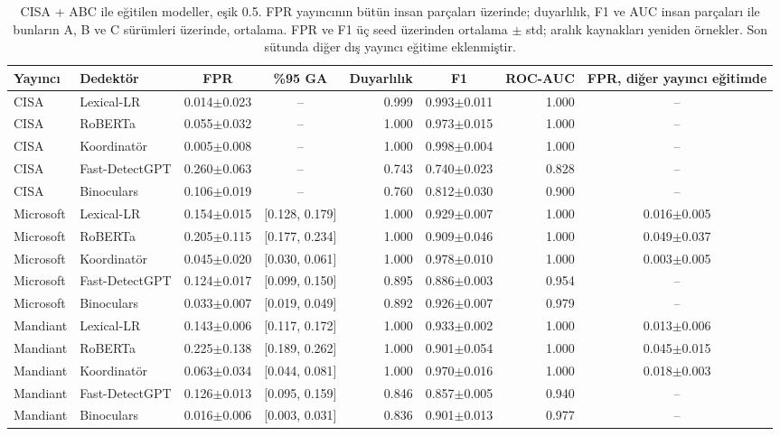 \begin{table}[t]
\centering
\footnotesize
\caption{CISA + ABC ile eğitilen modeller, eşik 0.5. FPR yayıncının bütün insan parçaları üzerinde; duyarlılık, F1 ve AUC insan parçaları ile bunların A, B ve C sürümleri üzerinde, ortalama. FPR ve F1 üç seed üzerinden ortalama $\pm$ std; aralık kaynakları yeniden örnekler. Son sütunda diğer dış yayıncı eğitime eklenmiştir.}
\label{tab:publishers}
\begin{tabular}{llccrcrc}
\toprule
Yayıncı & Dedektör & FPR & \%95 GA & Duyarlılık & F1 & ROC-AUC & FPR, diğer yayıncı eğitimde \\
\midrule
CISA & Lexical-LR & 0.014$\pm$0.023 & -- & 0.999 & 0.993$\pm$0.011 & 1.000 & -- \\
CISA & RoBERTa & 0.055$\pm$0.032 & -- & 1.000 & 0.973$\pm$0.015 & 1.000 & -- \\
CISA & Koordinatör & 0.005$\pm$0.008 & -- & 1.000 & 0.998$\pm$0.004 & 1.000 & -- \\
CISA & Fast-DetectGPT & 0.260$\pm$0.063 & -- & 0.743 & 0.740$\pm$0.023 & 0.828 & -- \\
CISA & Binoculars & 0.106$\pm$0.019 & -- & 0.760 & 0.812$\pm$0.030 & 0.900 & -- \\
Microsoft & Lexical-LR & 0.154$\pm$0.015 & [0.128, 0.179] & 1.000 & 0.929$\pm$0.007 & 1.000 & 0.016$\pm$0.005 \\
Microsoft & RoBERTa & 0.205$\pm$0.115 & [0.177, 0.234] & 1.000 & 0.909$\pm$0.046 & 1.000 & 0.049$\pm$0.037 \\
Microsoft & Koordinatör & 0.045$\pm$0.020 & [0.030, 0.061] & 1.000 & 0.978$\pm$0.010 & 1.000 & 0.003$\pm$0.005 \\
Microsoft & Fast-DetectGPT & 0.124$\pm$0.017 & [0.099, 0.150] & 0.895 & 0.886$\pm$0.003 & 0.954 & -- \\
Microsoft & Binoculars & 0.033$\pm$0.007 & [0.019, 0.049] & 0.892 & 0.926$\pm$0.007 & 0.979 & -- \\
Mandiant & Lexical-LR & 0.143$\pm$0.006 & [0.117, 0.172] & 1.000 & 0.933$\pm$0.002 & 1.000 & 0.013$\pm$0.006 \\
Mandiant & RoBERTa & 0.225$\pm$0.138 & [0.189, 0.262] & 1.000 & 0.901$\pm$0.054 & 1.000 & 0.045$\pm$0.015 \\
Mandiant & Koordinatör & 0.063$\pm$0.034 & [0.044, 0.081] & 1.000 & 0.970$\pm$0.016 & 1.000 & 0.018$\pm$0.003 \\
Mandiant & Fast-DetectGPT & 0.126$\pm$0.013 & [0.095, 0.159] & 0.846 & 0.857$\pm$0.005 & 0.940 & -- \\
Mandiant & Binoculars & 0.016$\pm$0.006 & [0.003, 0.031] & 0.836 & 0.901$\pm$0.013 & 0.977 & -- \\
\bottomrule
\end{tabular}
\end{table}

